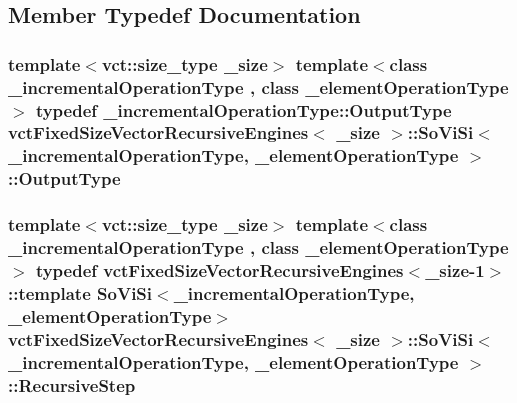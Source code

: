\subsection{Member Typedef Documentation}
\hypertarget{classvct_fixed_size_vector_recursive_engines_1_1_so_vi_si_a44d1ef1068c419fc926e4fd821d08402}{
\subsubsection[{Output\-Type}]{\setlength{\rightskip}{0pt plus 5cm}template$<$vct\-::size\-\_\-type \-\_\-size$>$ template$<$class \-\_\-incremental\-Operation\-Type , class \-\_\-element\-Operation\-Type $>$ typedef \-\_\-incremental\-Operation\-Type\-::\-Output\-Type {\bf vct\-Fixed\-Size\-Vector\-Recursive\-Engines}$<$ \-\_\-size $>$\-::{\bf So\-Vi\-Si}$<$ \-\_\-incremental\-Operation\-Type, \-\_\-element\-Operation\-Type $>$\-::{\bf Output\-Type}}}\label{classvct_fixed_size_vector_recursive_engines_1_1_so_vi_si_a44d1ef1068c419fc926e4fd821d08402}
\hypertarget{classvct_fixed_size_vector_recursive_engines_1_1_so_vi_si_a595f643d9cca8d3c8a84a4c680679ad0}{
\subsubsection[{Recursive\-Step}]{\setlength{\rightskip}{0pt plus 5cm}template$<$vct\-::size\-\_\-type \-\_\-size$>$ template$<$class \-\_\-incremental\-Operation\-Type , class \-\_\-element\-Operation\-Type $>$ typedef {\bf vct\-Fixed\-Size\-Vector\-Recursive\-Engines}$<$\-\_\-size-\/1$>$\-::template {\bf So\-Vi\-Si}$<$\-\_\-incremental\-Operation\-Type, \-\_\-element\-Operation\-Type$>$ {\bf vct\-Fixed\-Size\-Vector\-Recursive\-Engines}$<$ \-\_\-size $>$\-::{\bf So\-Vi\-Si}$<$ \-\_\-incremental\-Operation\-Type, \-\_\-element\-Operation\-Type $>$\-::{\bf Recursive\-Step}}}\label{classvct_fixed_size_vector_recursive_engines_1_1_so_vi_si_a595f643d9cca8d3c8a84a4c680679ad0}


